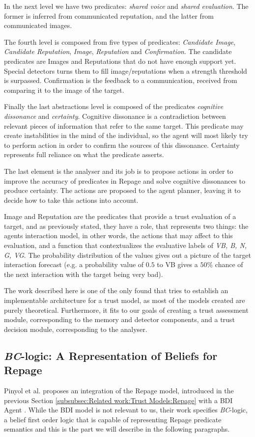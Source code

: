 In the next level we have two predicates: \textit{shared voice} and \textit{shared evaluation}. The former is inferred from communicated reputation, and the latter from communicated images. 

The fourth level is composed from five types of predicates: \textit{Candidate Image}, \textit{Candidate Reputation}, \textit{Image}, \textit{Reputation} and \textit{Confirmation}. The candidate predicates are Images and Reputations that do not have enough support yet. Special detectors turns them to fill image/reputations when a strength threshold is surpassed. Confirmation is the feedback to a communication, received from comparing it to the image of the target. 

Finally the last abstractions level is composed of the predicates \textit{cognitive dissonance} and \textit{certainty}. Cognitive dissonance is a contradiction between relevant pieces of information that refer to the same target. This predicate may create instabilities in the mind of the individual, so the agent will most likely try to perform action in order to confirm the sources of this dissonance. Certainty represents full reliance on what the predicate asserts.

The last element is the analyser and its job is to propose actions in order to improve the accuracy of predicates in Repage and solve cognitive dissonances to produce certainty. The actions are proposed to the agent planner, leaving it to decide how to take this actions into account.

Image and Reputation are the predicates that provide a trust evaluation of a target, and as previously stated, they have a role, that represents two things: the agents interaction model, in other words, the actions that may affect to this evaluation, and a function that contextualizes the evaluative labels of \textit{VB, B, N, G, VG}. The probability distribution of the values gives out a picture of the target interaction forecast (e.g. a probability value of $0.5$ to VB gives a $50\%$ chance of the next interaction with the target being very bad).

The work described here is one of the only found that tries to establish an implementable architecture for a trust model, as most of the models created are purely theoretical. Furthermore, it fits to our goals of creating a trust assessment module, corresponding to the memory and detector components, and a trust decision module, corresponding to the analyser.


\subsection{\textit{BC}-logic: A Representation of Beliefs for Repage}
\label{subsec:Related work:Trust Models:BDI + Repage}
Pinyol et al. \cite{Pinyol2009} proposes an integration of the Repage model, introduced in the previous Section \ref{subsubsec:Related work:Trust Models:Repage} with a \ac{BDI} Agent \cite{Rao1995}. While the \ac{BDI} model is not relevant to us, their work specifies \textit{BC}-logic, a belief first order logic that is capable of representing Repage predicate semantics and this is the part we will describe in the following paragraphs.

